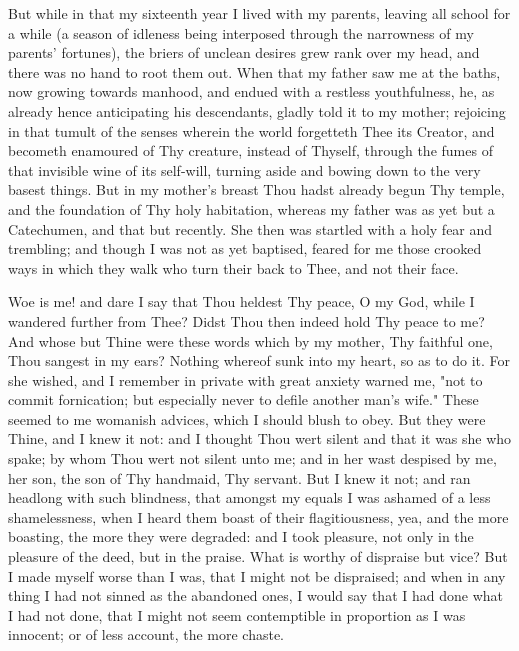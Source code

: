 \documentclass[b5paper,openright,12pt,twoside]{book}
\begin{document}
But while in that my sixteenth year I lived with my parents, leaving all
school for a while (a season of idleness being interposed through the
narrowness of my parents' fortunes), the briers of unclean desires grew
rank over my head, and there was no hand to root them out. When that my
father saw me at the baths, now growing towards manhood, and endued
with a restless youthfulness, he, as already hence anticipating his
descendants, gladly told it to my mother; rejoicing in that tumult of
the senses wherein the world forgetteth Thee its Creator, and becometh
enamoured of Thy creature, instead of Thyself, through the fumes of that
invisible wine of its self-will, turning aside and bowing down to the
very basest things. But in my mother's breast Thou hadst already begun
Thy temple, and the foundation of Thy holy habitation, whereas my
father was as yet but a Catechumen, and that but recently. She then was
startled with a holy fear and trembling; and though I was not as yet
baptised, feared for me those crooked ways in which they walk who turn
their back to Thee, and not their face.

Woe is me! and dare I say that Thou heldest Thy peace, O my God, while I
wandered further from Thee? Didst Thou then indeed hold Thy peace to me?
And whose but Thine were these words which by my mother, Thy faithful
one, Thou sangest in my ears? Nothing whereof sunk into my heart, so as
to do it. For she wished, and I remember in private with great anxiety
warned me, "not to commit fornication; but especially never to defile
another man's wife." These seemed to me womanish advices, which I should
blush to obey. But they were Thine, and I knew it not: and I thought
Thou wert silent and that it was she who spake; by whom Thou wert not
silent unto me; and in her wast despised by me, her son, the son of Thy
handmaid, Thy servant. But I knew it not; and ran headlong with such
blindness, that amongst my equals I was ashamed of a less shamelessness,
when I heard them boast of their flagitiousness, yea, and the more
boasting, the more they were degraded: and I took pleasure, not only in
the pleasure of the deed, but in the praise. What is worthy of dispraise
but vice? But I made myself worse than I was, that I might not be
dispraised; and when in any thing I had not sinned as the abandoned
ones, I would say that I had done what I had not done, that I might not
seem contemptible in proportion as I was innocent; or of less account,
the more chaste.
\end{document}
